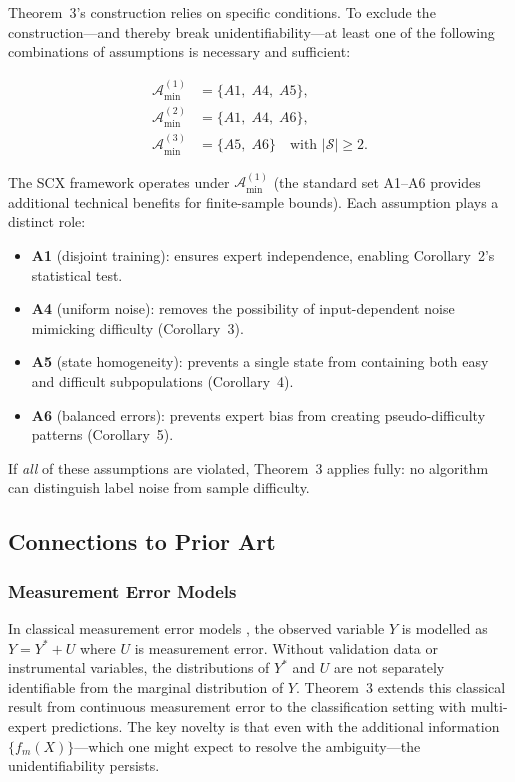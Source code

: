 Theorem~3's construction relies on specific conditions.  To exclude the
construction---and thereby break unidentifiability---at least one of the
following combinations of assumptions is necessary and sufficient:

\[
\begin{aligned}
\mathcal{A}_{\min}^{(1)} &= \{A1,\;A4,\;A5\},\\
\mathcal{A}_{\min}^{(2)} &= \{A1,\;A4,\;A6\},\\
\mathcal{A}_{\min}^{(3)} &= \{A5,\;A6\}\quad\text{with }|\mathcal{S}|\ge2.
\end{aligned}
\]

The SCX framework operates under $\mathcal{A}_{\min}^{(1)}$ (the standard
set A1--A6 provides additional technical benefits for finite-sample bounds).
Each assumption plays a distinct role:
\begin{itemize}
  \item \textbf{A1} (disjoint training): ensures expert independence, enabling
    Corollary~2's statistical test.
  \item \textbf{A4} (uniform noise): removes the possibility of
    input-dependent noise mimicking difficulty (Corollary~3).
  \item \textbf{A5} (state homogeneity): prevents a single state from
    containing both easy and difficult subpopulations (Corollary~4).
  \item \textbf{A6} (balanced errors): prevents expert bias from creating
    pseudo-difficulty patterns (Corollary~5).
\end{itemize}

If \emph{all} of these assumptions are violated, Theorem~3 applies fully:
no algorithm can distinguish label noise from sample difficulty.

\subsection{Connections to Prior Art}
\label{sec:thm3_prior}

\subsubsection{Measurement Error Models}

In classical measurement error models
\cite{fuller1987measurement,carroll2006measurement}, the observed variable
$Y$ is modelled as $Y=Y^*+U$ where $U$ is measurement error.  Without
validation data or instrumental variables, the distributions of $Y^*$ and
$U$ are not separately identifiable from the marginal distribution of $Y$.
Theorem~3 extends this classical result from continuous measurement error to
the classification setting with multi-expert predictions.  The key novelty is
that even with the additional information $\{f_m(X)\}$---which one might
expect to resolve the ambiguity---the unidentifiability persists.

